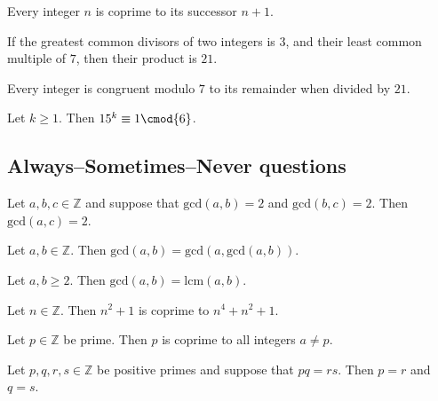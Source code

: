 \begin{chapex} %
Every integer $n$ is coprime to its successor $n+1$.
\end{chapex}

\begin{chapex} %
If the greatest common divisors of two integers is $3$, and their least common multiple of $7$, then their product is $21$.
\end{chapex}

\begin{chapex} %
Every integer is congruent modulo $7$ to its remainder when divided by $21$.
\end{chapex}

\begin{chapex} %
\label{cqNumberTheoryTFEnd}
Let $k \ge 1$. Then $15^k \equiv 1 \cmod{6}$.
\end{chapex}

\subsection*{Always--Sometimes--Never questions}


\begin{chapex} %
\label{cqNumberTheoryASNBegin}
Let $a,b,c \in \mathbb{Z}$ and suppose that $\mathrm{gcd}(a,b) = 2$ and $\mathrm{gcd}(b,c) = 2$. Then $\mathrm{gcd}(a,c) = 2$.
\end{chapex}

\begin{chapex} %
Let $a,b \in \mathbb{Z}$. Then $\mathrm{gcd}(a,b) = \mathrm{gcd}(a,\mathrm{gcd}(a,b))$.
\end{chapex}

\begin{chapex} %
Let $a,b \ge 2$. Then $\mathrm{gcd}(a,b) = \mathrm{lcm}(a,b)$.
\end{chapex}

\begin{chapex} %
Let $n \in \mathbb{Z}$. Then $n^2+1$ is coprime to $n^4+n^2+1$.
\end{chapex}

\begin{chapex} %
Let $p \in \mathbb{Z}$ be prime. Then $p$ is coprime to all integers $a \ne p$.
\end{chapex}

\begin{chapex} %
Let $p,q,r,s \in \mathbb{Z}$ be positive primes and suppose that $pq=rs$. Then $p=r$ and $q=s$.
\end{chapex}

